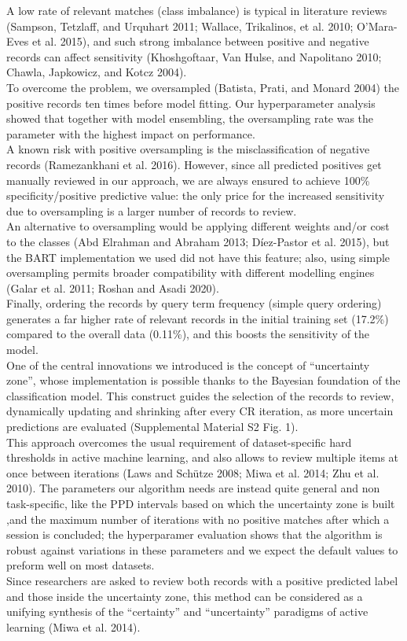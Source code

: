 \documentclass{article}
\begin{document}
A low rate of relevant matches (class imbalance) is typical in
literature reviews (Sampson, Tetzlaff, and Urquhart 2011; Wallace,
Trikalinos, et al. 2010; O'Mara-Eves et al. 2015), and such strong
imbalance between positive and negative records can affect sensitivity
(Khoshgoftaar, Van Hulse, and Napolitano 2010; Chawla, Japkowicz, and
Kotcz 2004).\\
To overcome the problem, we oversampled (Batista, Prati, and Monard
2004) the positive records ten times before model fitting. Our
hyperparameter analysis showed that together with model ensembling, the
oversampling rate was the parameter with the highest impact on
performance.\\
A known risk with positive oversampling is the misclassification of
negative records (Ramezankhani et al. 2016). However, since all
predicted positives get manually reviewed in our approach, we are always
ensured to achieve 100\% specificity/positive predictive value: the only
price for the increased sensitivity due to oversampling is a larger
number of records to review.\\
An alternative to oversampling would be applying different weights
and/or cost to the classes (Abd Elrahman and Abraham 2013; Díez-Pastor
et al. 2015), but the BART implementation we used did not have this
feature; also, using simple oversampling permits broader compatibility
with different modelling engines (Galar et al. 2011; Roshan and Asadi
2020).\\
Finally, ordering the records by query term frequency (simple query
ordering) generates a far higher rate of relevant records in the initial
training set (17.2\%) compared to the overall data (0.11\%), and this
boosts the sensitivity of the model.\\

One of the central innovations we introduced is the concept of
``uncertainty zone'', whose implementation is possible thanks to the
Bayesian foundation of the classification model. This construct guides
the selection of the records to review, dynamically updating and
shrinking after every CR iteration, as more uncertain predictions are
evaluated (Supplemental Material S2 Fig. 1).\\
This approach overcomes the usual requirement of dataset-specific hard
thresholds in active machine learning, and also allows to review
multiple items at once between iterations (Laws and Schütze 2008; Miwa
et al. 2014; Zhu et al. 2010). The parameters our algorithm needs are
instead quite general and non task-specific, like the PPD intervals
based on which the uncertainty zone is built ,and the maximum number of
iterations with no positive matches after which a session is concluded;
the hyperparamer evaluation shows that the algorithm is robust against
variations in these parameters and we expect the default values to
preform well on most datasets.\\
Since researchers are asked to review both records with a positive
predicted label and those inside the uncertainty zone, this method can
be considered as a unifying synthesis of the ``certainty'' and
``uncertainty'' paradigms of active learning (Miwa et al. 2014).\\
\end{document}
